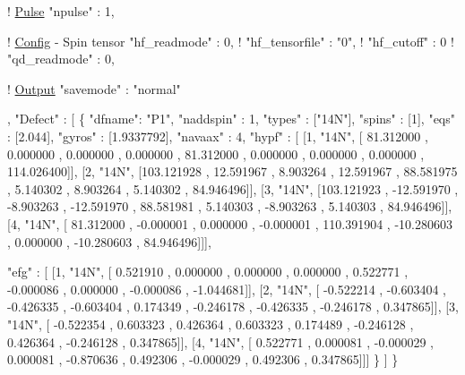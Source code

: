 \begin{DoxyCodeInclude}
    ! \hyperlink{structPulse}{Pulse}
    \textcolor{stringliteral}{"npulse"}      : 1,

    ! \hyperlink{structConfig}{Config} - Spin tensor
    \textcolor{stringliteral}{"hf\_readmode"}   : 0, 
!  \textcolor{stringliteral}{"hf\_tensorfile"} : \textcolor{stringliteral}{"0"},
!  \textcolor{stringliteral}{"hf\_cutoff"}     : 0
!  \textcolor{stringliteral}{"qd\_readmode"}   : 0,

    ! \hyperlink{structOutput}{Output}
    \textcolor{stringliteral}{"savemode"}    : \textcolor{stringliteral}{"normal"}

,  \textcolor{stringliteral}{"Defect"}         : [
        \{   
            \textcolor{stringliteral}{"dfname"}: \textcolor{stringliteral}{"P1"},
            \textcolor{stringliteral}{"naddspin"} : 1,
            \textcolor{stringliteral}{"types"} : [\textcolor{stringliteral}{"14N"}],
            \textcolor{stringliteral}{"spins"} : [1],
            \textcolor{stringliteral}{"eqs"}   : [2.044],
            \textcolor{stringliteral}{"gyros"} : [1.9337792],
            \textcolor{stringliteral}{"navaax"} : 4,
            \textcolor{stringliteral}{"hypf"} : [ [1, \textcolor{stringliteral}{"14N"}, [ 81.312000 ,     0.000000 ,    0.000000 ,    0.000000 ,    81.312000 ,  
        0.000000 ,   0.000000 ,    0.000000 ,    114.026400]],
                       [2, \textcolor{stringliteral}{"14N"}, [103.121928 ,    12.591967 ,    8.903264 ,   12.591967 ,    88.581975 ,  
        5.140302 ,   8.903264 ,    5.140302 ,     84.946496]],
                       [3, \textcolor{stringliteral}{"14N"}, [103.121923 ,   -12.591970 ,   -8.903263 ,  -12.591970 ,    88.581981 ,  
        5.140303 ,  -8.903263 ,    5.140303 ,     84.946496]],
                       [4, \textcolor{stringliteral}{"14N"}, [ 81.312000 ,    -0.000001 ,    0.000000 ,   -0.000001 ,   110.391904 ,  
      -10.280603 ,   0.000000 ,  -10.280603 ,     84.946496]]],
        
            \textcolor{stringliteral}{"efg"} :  [ [1, \textcolor{stringliteral}{"14N"}, [  0.521910 ,     0.000000 ,    0.000000 ,    0.000000 ,     0.522771 ,  
       -0.000086 ,   0.000000 ,   -0.000086 ,     -1.044681]],
                       [2, \textcolor{stringliteral}{"14N"}, [ -0.522214 ,    -0.603404 ,   -0.426335 ,   -0.603404 ,     0.174349 ,  
       -0.246178 ,  -0.426335 ,   -0.246178 ,      0.347865]],
                       [3, \textcolor{stringliteral}{"14N"}, [ -0.522354 ,     0.603323 ,    0.426364 ,    0.603323 ,     0.174489 ,  
       -0.246128 ,   0.426364 ,   -0.246128 ,      0.347865]],
                       [4, \textcolor{stringliteral}{"14N"}, [  0.522771 ,     0.000081 ,   -0.000029 ,    0.000081 ,    -0.870636 ,  
        0.492306 ,  -0.000029 ,    0.492306 ,      0.347865]]]
        \}
                       ]
\}
\end{DoxyCodeInclude}
 
